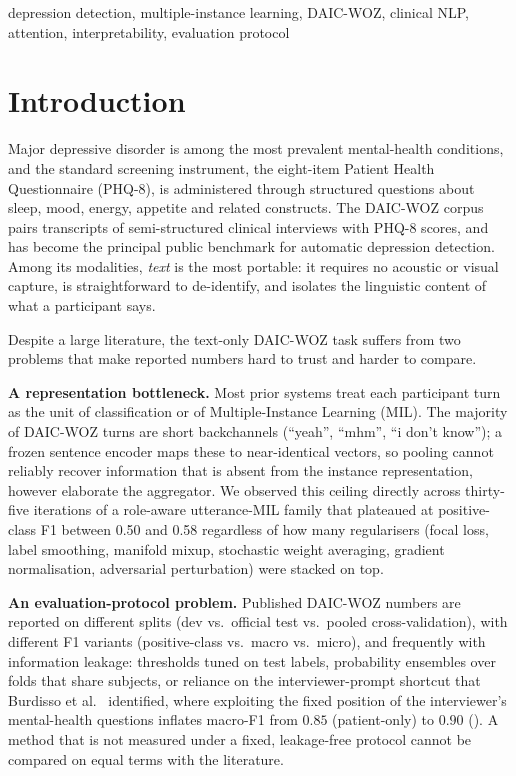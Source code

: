 \documentclass[conference]{IEEEtran}
\begin{document}
\begin{IEEEkeywords}
depression detection, multiple-instance learning, DAIC-WOZ, clinical NLP,
attention, interpretability, evaluation protocol
\end{IEEEkeywords}

\section{Introduction}

Major depressive disorder is among the most prevalent mental-health
conditions, and the standard screening instrument, the eight-item Patient
Health Questionnaire (PHQ-8), is administered through structured questions
about sleep, mood, energy, appetite and related constructs. The DAIC-WOZ
corpus \cite{gratch2014,devault2014} pairs transcripts of semi-structured
clinical interviews with PHQ-8 scores, and has become the principal public
benchmark for automatic depression detection. Among its modalities, \emph{text} is the most portable: it requires
no acoustic or visual capture, is straightforward to de-identify, and isolates
the linguistic content of what a participant says.

Despite a large literature, the text-only DAIC-WOZ task suffers from two
problems that make reported numbers hard to trust and harder to compare.

\textbf{A representation bottleneck.} Most prior systems treat each
participant turn as the unit of classification or of Multiple-Instance
Learning (MIL). The majority of DAIC-WOZ turns are short backchannels
(``yeah'', ``mhm'', ``i don't know''); a frozen sentence encoder maps these to
near-identical vectors, so pooling cannot reliably recover information that is
absent from the instance representation, however elaborate the aggregator. We observed this ceiling directly across
thirty-five iterations of a role-aware utterance-MIL family that plateaued at
positive-class F1 between 0.50 and 0.58 regardless of how many regularisers
(focal loss, label smoothing, manifold mixup, stochastic weight averaging,
gradient normalisation, adversarial perturbation) were stacked on top.

\textbf{An evaluation-protocol problem.} Published DAIC-WOZ numbers are
reported on different splits (dev vs.\ official test vs.\ pooled
cross-validation), with different F1 variants (positive-class vs.\ macro
vs.\ micro), and frequently with information leakage: thresholds tuned on test
labels, probability ensembles over folds that share subjects, or reliance on
the interviewer-prompt shortcut that Burdisso et al.\ \cite{burdisso2024}
identified, where exploiting the fixed position of the interviewer's
mental-health questions inflates macro-F1 from $0.85$ (patient-only) to $0.90$
(). A method that is not measured under a
fixed, leakage-free protocol cannot be compared on equal terms with the literature.
\end{document}
